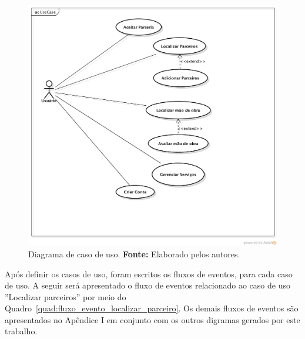 \newpage
\begin{figure}[h!]
	\centerline{\includegraphics[scale=0.5]{./imagens/caso-de-uso-unificado.png}}
	\caption[Diagrama de caso de uso]
	{Diagrama de caso de uso. \textbf{Fonte:} Elaborado pelos autores.}
	\label{fig:caso_uso_unificado}
\end{figure}



\par Após definir os casos de uso, foram escritos os fluxos de eventos, para cada caso de uso. A seguir será apresentado o fluxo de eventos relacionado ao caso de uso ''Localizar parceiros'' por meio do Quadro~\ref{quad:fluxo_evento_localizar_parceiro}. Os demais fluxos de eventos são apresentados no Apêndice I em conjunto com os outros digramas gerados por este trabalho.

